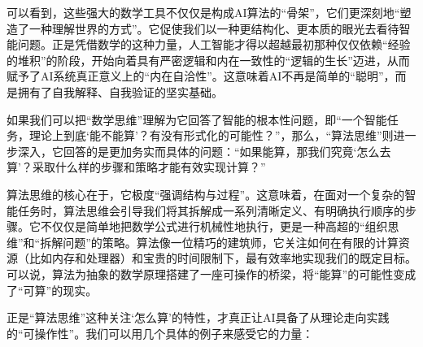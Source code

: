 可以看到，这些强大的数学工具不仅仅是构成AI算法的“骨架”，它们更深刻地“塑造了一种理解世界的方式”。它促使我们以一种更结构化、更本质的眼光去看待智能问题。正是凭借数学的这种力量，人工智能才得以超越最初那种仅仅依赖“经验的堆积”的阶段，开始向着具有严密逻辑和内在一致性的“逻辑的生长”迈进，从而赋予了AI系统真正意义上的“内在自洽性”。这意味着AI不再是简单的“聪明”，而是拥有了自我解释、自我验证的坚实基础。



如果我们可以把“数学思维”理解为它回答了智能的根本性问题，即“一个智能任务，理论上到底‘能不能算’？有没有形式化的可能性？”，那么，“算法思维”则进一步深入，它回答的是更加务实而具体的问题：“如果能算，那我们究竟‘怎么去算’？采取什么样的步骤和策略才能有效实现计算？”

算法思维的核心在于，它极度“强调结构与过程”。这意味着，在面对一个复杂的智能任务时，算法思维会引导我们将其拆解成一系列清晰定义、有明确执行顺序的步骤。它不仅仅是简单地把数学公式进行机械性地执行，更是一种高超的“组织思维”和“拆解问题”的策略。算法像一位精巧的建筑师，它关注如何在有限的计算资源（比如内存和处理器）和宝贵的时间限制下，最有效率地实现我们的既定目标。可以说，算法为抽象的数学原理搭建了一座可操作的桥梁，将“能算”的可能性变成了“可算”的现实。



正是“算法思维”这种关注‘怎么算’的特性，才真正让AI具备了从理论走向实践的“可操作性”。我们可以用几个具体的例子来感受它的力量：

